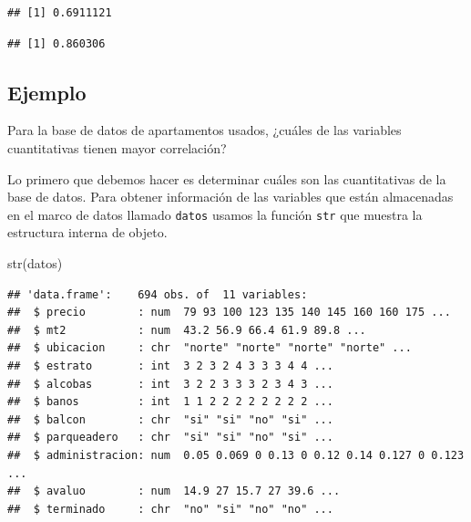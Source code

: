 \documentclass[
]{book}
\makeatletter
\newenvironment{Shaded}{\begin{snugshade}}{\end{snugshade}}
\newcommand{\AttributeTok}[1]{\textcolor[rgb]{0.77,0.63,0.00}{#1}}
\newcommand{\FunctionTok}[1]{\textcolor[rgb]{0.00,0.00,0.00}{#1}}
\newcommand{\NormalTok}[1]{#1}
\newcommand{\SpecialCharTok}[1]{\textcolor[rgb]{0.00,0.00,0.00}{#1}}
\newcommand{\StringTok}[1]{\textcolor[rgb]{0.31,0.60,0.02}{#1}}
\newenvironment{kframe}{%
\medskip{}
\setlength{\fboxsep}{.8em}
 \def\at@end@of@kframe{}%
 \ifinner\ifhmode%
  \def\at@end@of@kframe{\end{minipage}}%
  \begin{minipage}{\columnwidth}%
 \fi\fi%
 \def\FrameCommand##1{\hskip\@totalleftmargin \hskip-\fboxsep
 \colorbox{shadecolor}{##1}\hskip-\fboxsep
     \hskip-\linewidth \hskip-\@totalleftmargin \hskip\columnwidth}%
 \MakeFramed {\advance\hsize-\width
   \@totalleftmargin\z@ \linewidth\hsize
   \@setminipage}}%
 {\par\unskip\endMakeFramed%
 \at@end@of@kframe}
\renewenvironment{Shaded}{\begin{kframe}}{\end{kframe}}
\makeatother
\begin{document}
\begin{verbatim}
## [1] 0.6911121
\end{verbatim}

\begin{Shaded}
\end{Shaded}

\begin{verbatim}
## [1] 0.860306
\end{verbatim}

\hypertarget{ejemplo-45}{%
\subsection*{Ejemplo}\label{ejemplo-45}}

Para la base de datos de apartamentos usados, ¿cuáles de las variables cuantitativas tienen mayor correlación?

Lo primero que debemos hacer es determinar cuáles son las cuantitativas de la base de datos. Para obtener información de las variables que están almacenadas en el marco de datos llamado \texttt{datos} usamos la función \texttt{str} que muestra la estructura interna de objeto.

\begin{Shaded}
\begin{Highlighting}[]
\FunctionTok{str}\NormalTok{(datos)}
\end{Highlighting}
\end{Shaded}

\begin{verbatim}
## 'data.frame':    694 obs. of  11 variables:
##  $ precio        : num  79 93 100 123 135 140 145 160 160 175 ...
##  $ mt2           : num  43.2 56.9 66.4 61.9 89.8 ...
##  $ ubicacion     : chr  "norte" "norte" "norte" "norte" ...
##  $ estrato       : int  3 2 3 2 4 3 3 3 4 4 ...
##  $ alcobas       : int  3 2 2 3 3 3 2 3 4 3 ...
##  $ banos         : int  1 1 2 2 2 2 2 2 2 2 ...
##  $ balcon        : chr  "si" "si" "no" "si" ...
##  $ parqueadero   : chr  "si" "si" "no" "si" ...
##  $ administracion: num  0.05 0.069 0 0.13 0 0.12 0.14 0.127 0 0.123 ...
##  $ avaluo        : num  14.9 27 15.7 27 39.6 ...
##  $ terminado     : chr  "no" "si" "no" "no" ...
\end{verbatim}
\end{document}
